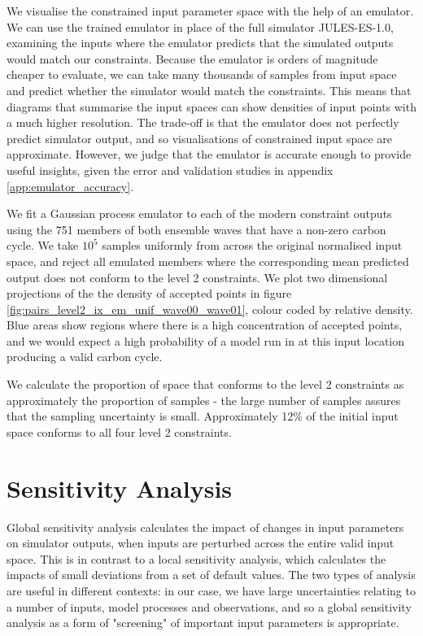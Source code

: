 \documentclass[gmd, manuscript]{copernicus}
\begin{document}
We visualise the constrained input parameter space with the help of an emulator. We can use the trained emulator in place of the full simulator JULES-ES-1.0, examining the inputs where the emulator predicts that the simulated outputs would match our constraints. Because the emulator is orders of magnitude cheaper to evaluate, we can take many thousands of samples from input space and predict whether the simulator would match the constraints. This means that diagrams that summarise the input spaces can show densities of input points with a much higher resolution. The trade-off is that the emulator does not perfectly predict simulator output, and so visualisations of constrained input space are approximate. However, we judge that the emulator is accurate enough to provide useful insights, given the error and validation studies in appendix \ref{app:emulator_accuracy}.

We fit a Gaussian process emulator to each of the modern constraint outputs using the 751 members of both ensemble waves that have a non-zero carbon cycle. We take $10^{5}$ samples uniformly from across the original normalised input space, and reject all emulated members where the corresponding mean predicted output does not conform to the level 2 constraints. We plot two dimensional projections of the the density of accepted points in figure \ref{fig:pairs_level2_ix_em_unif_wave00_wave01}, colour coded by relative density. Blue areas show regions where there is a high concentration of accepted points, and we would expect a high probability of a model run in at this input location producing a valid carbon cycle.

We calculate the proportion of space that conforms to the level 2 constraints as approximately the proportion of samples - the large number of samples assures that the sampling uncertainty is small. Approximately 12\% of the initial input space conforms to all four level 2 constraints.

\section{Sensitivity Analysis}\label{sec:sensitivity_analysis}

Global sensitivity analysis calculates the impact of changes in input parameters on simulator outputs, when inputs are perturbed across the entire valid input space. This is in contrast to a local sensitivity analysis, which calculates the impacts of small deviations from a set of default values. The two types of analysis are useful in different contexts: in our case, we have large uncertainties relating to a number of inputs, model processes and observations, and so a global sensitivity analysis as a form of "screening" of important input parameters is appropriate.
\end{document}
